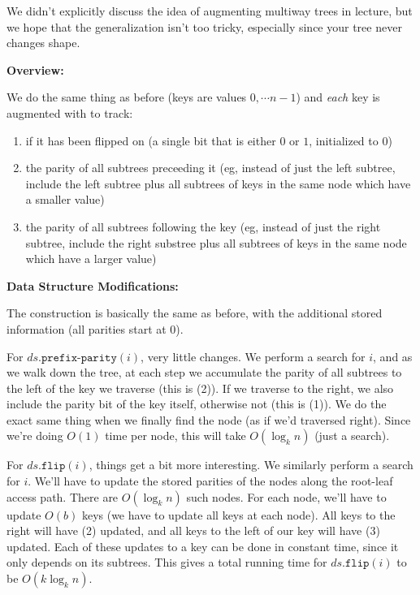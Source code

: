 \documentclass[12pt]{exam}
\newcommand*{\bigo}[1]{O\left( #1 \right)}
\begin{document}
\begin{questions}
\begin{parts}
We didn't explicitly discuss the idea of augmenting multiway trees in lecture, but we hope that the generalization isn't too tricky, especially since your tree never changes shape.

\begin{solution}
\textbf{Overview:}

We do the same thing as before (keys are values $0, \cdots n-1$) and \textit{each} key is augmented with to track:
\begin{enumerate}
  \item if it has been flipped on (a single bit that is either $0$ or $1$, initialized to $0$)
  \item the parity of all subtrees preceeding it (eg, instead of just the left subtree, include the left subtree plus all subtrees of keys in the same node which have a smaller value)
  \item the parity of all subtrees following the key (eg, instead of just the right subtree, include the right substree plus all subtrees of keys in the same node which have a larger value)
\end{enumerate}

\textbf{Data Structure Modifications: }

The construction is basically the same as before, with the additional stored information (all parities start at 0).

For $ds.\texttt{prefix-parity}(i)$, very little changes. We perform a search for $i$, and as we walk down the tree, at each step we accumulate the parity of all subtrees to the left of the key we traverse (this is (2)). If we traverse to the right, we also include the parity bit of the key itself, otherwise not (this is (1)). We do the exact same thing when we finally find the node (as if we'd traversed right). Since we're doing $\bigo{1}$ time per node, this will take $\bigo{\log_k n}$ (just a search).

For $ds.\texttt{flip}(i)$, things get a bit more interesting. We similarly perform a search for $i$. We'll have to update the stored parities of the nodes along the root-leaf access path. There are $\bigo{\log_k n}$ such nodes. For each node, we'll have to update $\bigo{b}$ keys (we have to update all keys at each node). All keys to the right will have (2) updated, and all keys to the left of our key will have (3) updated. Each of these updates to a key can be done in constant time, since it only depends on its subtrees. This gives a total running time for $ds.\texttt{flip}(i)$ to be $\bigo{k \log_k n}$.


\end{solution}
\end{parts}
\end{questions}
\end{document}
